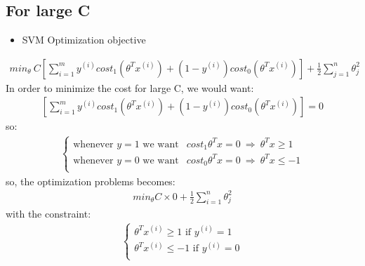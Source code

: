 \documentclass[a4paper,12pt]{report}
\begin{document}
\subsection{For large C}
\begin{itemize}
\item SVM Optimization objective
\end{itemize}
\begin{align}
min _{\theta} \ C \left[ \sum_{i=1} ^m y^{(i)} cost_1 (\theta^T x^{(i)}) + (1-y^{(i)}) cost_0( \theta^T x^{(i)})\right] + \frac{1}{2} \sum_{j=1} ^{n} \theta_j ^2 
\end{align}
In order to minimize the cost for large C, we would want:
\begin{align}
\left[ \sum_{i=1} ^m y^{(i)} cost_1 (\theta^T x^{(i)}) + (1-y^{(i)}) cost_0( \theta^T x^{(i)})\right] = 0
\end{align}
so:
\begin{align}
\begin{cases}
    \text{whenever $y=1$ we want} & cost_1 \theta^T x = 0 \ \Rightarrow  \ \theta^T x \geq 1  \\
    \text{whenever $y=0$ we want} & cost_0 \theta^T x = 0 \ \Rightarrow  \  \theta^T x \leq -1 \\
  \end{cases}
\end{align}
so, the optimization problems becomes:
\begin{align}
min_{\theta} C \times 0 + \frac{1}{2} \sum_{i=1} ^{n} \theta_j ^2
\end{align}
with the constraint:
\begin{align}
\begin{cases}
    \theta^T x^{(i)} \geq 1  \text{\ if $y^{(i)}=1$}\\
    \theta^T x^{(i)} \leq -1  \text{\ if $y^{(i)}=0$}\\
  \end{cases}
\end{align}
\end{document}
